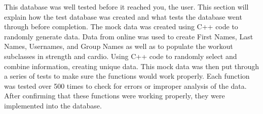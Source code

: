 This database was well tested before it reached you, the user. This section will explain how the test database was created and what tests the database went through before completion. The mock data was created using C++ code to randomly generate data. Data from online was used to create First Names, Last Names, Usernames, and Group Names as well as to populate the workout subclasses in strength and cardio. Using C++ code to randomly select and combine information, creating unique data. This mock data was then put through a series of tests to make sure the functions would work properly. Each function was tested over 500 times to check for errors or improper analysis of the data. After confirming that these functions were working properly, they were implemented into the database.